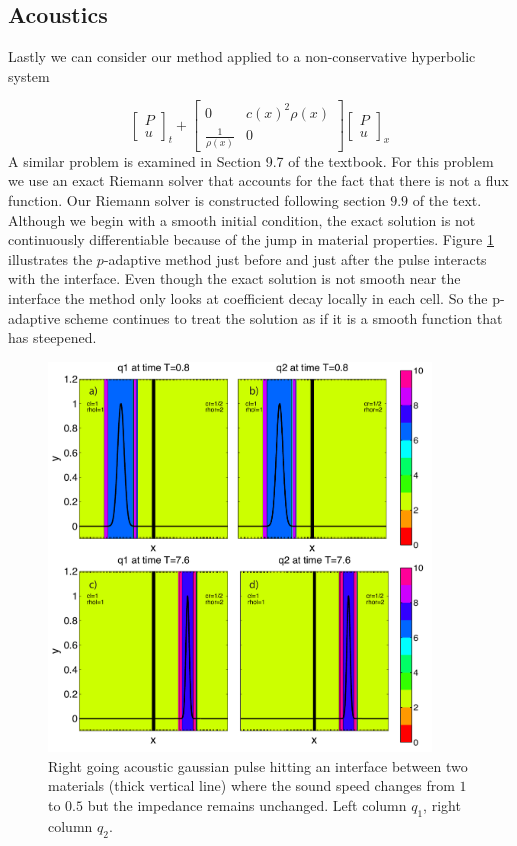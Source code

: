 \documentclass[10]{amsart}
\begin{document}
\subsection{Acoustics}
Lastly we can consider our method applied to a non-conservative hyperbolic system 

\begin{equation*}
\begin{bmatrix}
P\\ u
\end{bmatrix}_t+\begin{bmatrix} 0 & c(x)^2 \rho(x) \\ \frac{1}{\rho(x)} & 0 \end{bmatrix}
\begin{bmatrix}
P \\ u
\end{bmatrix}_x
\end{equation*}
A similar problem is examined in Section 9.7 of the textbook. For this problem
we use an exact Riemann solver that accounts for the fact that there is not a flux function. Our Riemann solver
is constructed following section $9.9$ of the text.
Although we begin with a smooth initial condition, the exact solution is not continuously differentiable because of the jump in material properties. Figure \ref{variableAcoustics} illustrates the $p$-adaptive method just before and just after the pulse interacts with the interface. Even though the exact solution is not smooth near the interface the method only looks at coefficient decay locally in each cell. So the p-adaptive scheme continues to treat the solution as if it is a smooth function that has steepened.

\begin{figure}
\hfil\includegraphics[width=4in]{figures/acousticVariableCoeff.pdf}\hfil
\caption{Right going acoustic gaussian pulse hitting an interface between two materials (thick vertical line) where the sound speed changes from $1$ to $0.5$ but the impedance remains unchanged. Left column $q_1$, right column $q_2$. }
\label{variableAcoustics}
\end{figure}
\end{document}
